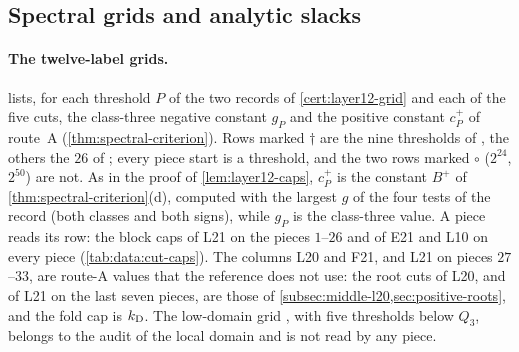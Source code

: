 \subsection{Spectral grids and analytic slacks}\label{subsec:data:grids}

\paragraph{The twelve-label grids.}
 lists, for each threshold $P$ of the two records of
\cref{cert:layer12-grid} and each of the five cuts, the class-three negative
constant $g_P$ and the positive constant $c^+_P$ of route~A
(\cref{thm:spectral-criterion}). Rows marked $\dagger$ are the nine thresholds of
, the others
the $26$ of ; every
piece start is a threshold, and the two rows marked $\circ$ ($2^{24}$, $2^{50}$)
are not. As in the proof of \cref{lem:layer12-caps}, $c^+_P$ is the constant
$B^+$ of \cref{thm:spectral-criterion}(d), computed with the largest $g$ of the
four tests of the record (both classes and both signs), while $g_P$ is the
class-three value. A piece reads its row: the block caps of L21 on the pieces
$1$--$26$ and of E21 and L10 on every piece (\cref{tab:data:cut-caps}). The
columns L20 and F21, and L21 on pieces $27$--$33$, are route-A values
that the reference does not use: the root cuts of L20, and of L21 on the last
seven pieces, are those of \cref{subsec:middle-l20,sec:positive-roots}, and the
fold cap is $k_{\rm D}$. The low-domain grid
, with five
thresholds below $Q_3$, belongs to the audit of the local domain and is not read
by any piece.


